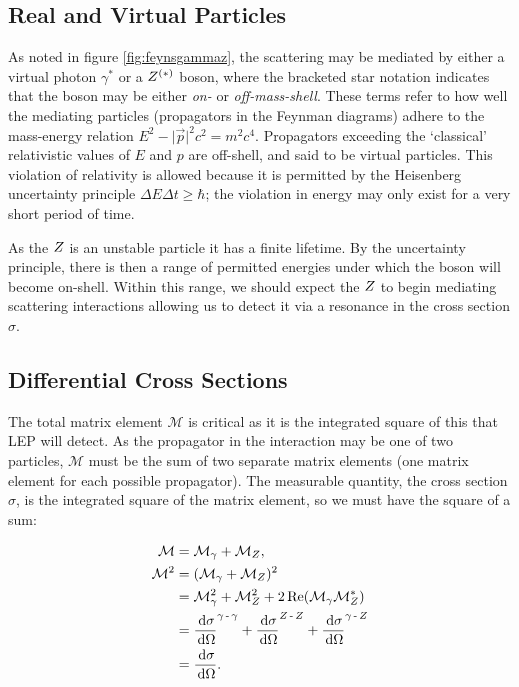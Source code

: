 \documentclass[]{article}
\begin{document}
\subsection{Real and Virtual Particles}

As noted in figure \ref{fig:feynsgammaz}, the scattering may be mediated by either a virtual photon $\gamma^{*}$ or a $Z ^{(*)}$ boson, where the bracketed star notation indicates that the boson may be either \emph{on-} or \emph{off-mass-shell}. These terms refer to how well the mediating particles (propagators in the Feynman diagrams) adhere to the mass-energy relation $E^{2} - \lvert{\vec{p}}\rvert^{2}c^{2} = m^{2}c^{4}$. Propagators exceeding the `classical' relativistic values of $E$ and $p$ are off-shell, and said to be virtual particles. This violation of relativity is allowed because it is permitted by the Heisenberg uncertainty principle $\Delta E\Delta t \geq \hbar$; the violation in energy may only exist for a very short period of time.

As the $Z $ is an unstable particle it has a finite lifetime. By the uncertainty principle, there is then a range of permitted energies under which the boson will become on-shell. Within this range, we should expect the $Z $ to begin mediating scattering interactions allowing us to detect it via a resonance in the cross section $\sigma$. 

\subsection{Differential Cross Sections}

The total matrix element $\mathcal{M}$ is critical as it is the integrated square of this that LEP will detect. As the propagator in the interaction may be one of two particles, $\mathcal{M}$ must be the sum of two separate matrix elements (one matrix element for each possible propagator). The measurable quantity, the cross section $\sigma$, is the integrated square of the matrix element, so we must have the square of a sum:

\begin{align*}
\mathcal{M} &= \mathcal{M}_{\gamma} + \mathcal{M}_{\Zzero},
\\
\mathcal{M}^{2} &= (\mathcal{M}_{\gamma} + \mathcal{M}_{\Zzero})^{2}
\\
&= \mathcal{M}_{\gamma}^{2} + \mathcal{M}_{\Zzero}^{2} + 2\operatorname{Re}(\mathcal{M}_{\gamma}\mathcal{M}_{\Zzero}^{*})
\\
&= \frac{\d{\sigma}}{\d{\Omega}}^{\gamma\operatorname{-}\gamma} +
	\frac{\d{\sigma}}{\d{\Omega}}^{\Zzero\operatorname{-}\Zzero} +
	\frac{\d{\sigma}}{\d{\Omega}}^{\gamma\operatorname{-}\Zzero}
\\
&= \frac{\d{\sigma}}{\d{\Omega}}.
\end{align*}
\end{document}
